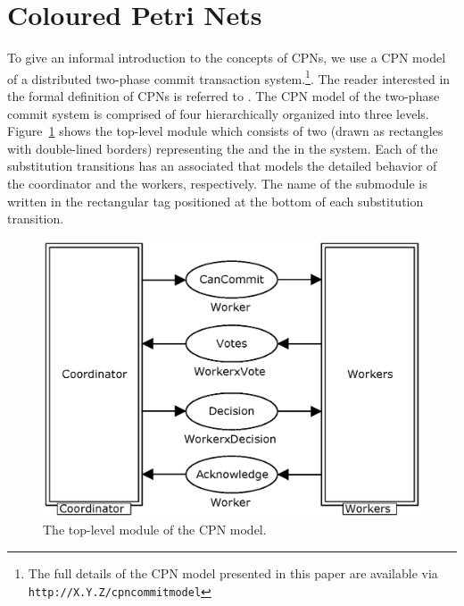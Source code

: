 \section{Coloured Petri Nets}
\label{sect:language}


To give an informal introduction to the concepts of CPNs, we use a CPN
model of a distributed two-phase commit transaction system.\footnote{The full details of the CPN model presented in this paper are available via \texttt{http://X.Y.Z/cpncommitmodel}}.  The reader
interested in the formal definition of CPNs is referred to
\cite{newcpnbook}. The CPN model of the two-phase commit system is
comprised of four  hierarchically organized into
three levels. Figure~\ref{fig:commit} shows the top-level module which
consists of two  (drawn as
rectangles with double-lined borders) representing the
 and the  in the system. Each of
the substitution transitions has an associated 
that models the detailed behavior of the coordinator and the workers,
respectively. The name of the submodule is written in the rectangular
tag positioned at the bottom of each substitution transition.

\begin{figure}[b]
\centering
\includegraphics[scale=.5]{figures/Commit.eps}
\caption{The top-level module of the CPN model.}
\label{fig:commit}
\end{figure}


